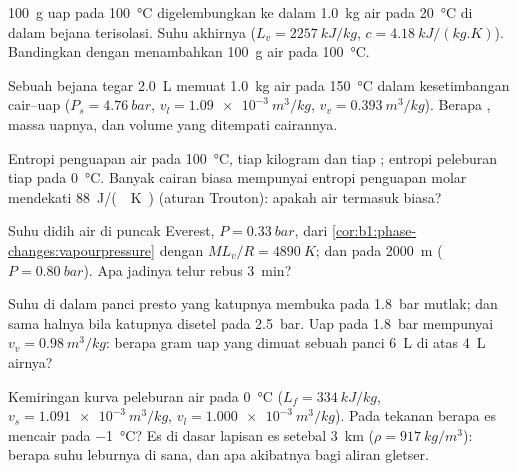 \begin{exercise}[$\star$]\label{exo:b1:phase-changes:2}
\qty{100}{g} uap pada \qty{100}{\degreeCelsius} digelembungkan ke dalam
\qty{1.0}{kg} air pada \qty{20}{\degreeCelsius} di dalam bejana terisolasi.
Suhu akhirnya ($L_v = \qty{2257}{kJ/kg}$, $c = \qty{4.18}{kJ/(kg.K)}$).
Bandingkan dengan menambahkan \qty{100}{g} air pada \qty{100}{\degreeCelsius}.
\end{exercise}

\begin{exercise}[$\star$]\label{exo:b1:phase-changes:3}
Sebuah bejana tegar \qty{2.0}{L} memuat \qty{1.0}{kg} air pada
\qty{150}{\degreeCelsius} dalam kesetimbangan cair--uap ($P_s =
\qty{4.76}{bar}$, $v_l = \qty{1.09e-3}{m^3/kg}$, $v_v = \qty{0.393}{m^3/kg}$).
Berapa , massa uapnya, dan volume yang ditempati cairannya.
\end{exercise}

\begin{exercise}[$\star$]\label{exo:b1:phase-changes:4}
Entropi penguapan air pada \qty{100}{\degreeCelsius}, tiap kilogram
dan tiap ; entropi peleburan tiap  pada \qty{0}{\degreeCelsius}. Banyak
cairan biasa mempunyai entropi penguapan molar mendekati
\qty{88}{J/(.K)} (aturan Trouton): apakah air termasuk biasa?
\end{exercise}

\begin{exercise}[$\star\star$]\label{exo:b1:phase-changes:5}
Suhu didih air di puncak Everest, $P =
\qty{0.33}{bar}$, dari \cref{cor:b1:phase-changes:vapourpressure} dengan
$ML_v/R = \qty{4890}{K}$; dan pada \qty{2000}{m} ($P = \qty{0.80}{bar}$). Apa
jadinya telur rebus \qty{3}{min}?
\end{exercise}

\begin{exercise}[$\star\star$]\label{exo:b1:phase-changes:6}
Suhu di dalam panci presto yang katupnya membuka pada \qty{1.8}{bar}
mutlak; dan sama halnya bila katupnya disetel pada \qty{2.5}{bar}. Uap pada
\qty{1.8}{bar} mempunyai $v_v = \qty{0.98}{m^3/kg}$: berapa gram uap yang dimuat
sebuah panci \qty{6}{L} di atas \qty{4}{L} airnya?
\end{exercise}

\begin{exercise}[$\star\star$]\label{exo:b1:phase-changes:7}
Kemiringan kurva peleburan air pada \qty{0}{\degreeCelsius} ($L_f =
\qty{334}{kJ/kg}$, $v_s = \qty{1.091e-3}{m^3/kg}$, $v_l = \qty{1.000e-3}{m^3/kg}$).
Pada tekanan berapa es mencair pada \qty{-1}{\degreeCelsius}? Es di
dasar lapisan es setebal \qty{3}{km} ($\rho = \qty{917}{kg/m^3}$): berapa suhu
leburnya di sana, dan apa akibatnya bagi aliran gletser.
\end{exercise}

